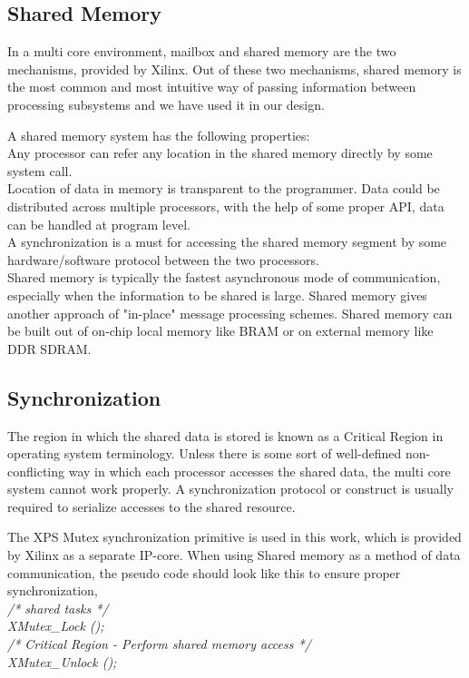 \documentclass[preprint,12pt]{elsarticle}
\begin{document}
 \subsection{ Shared Memory }
\label{shared}
 In a multi core environment, mailbox and shared memory \cite{mailbox} are the two mechanisms, provided by Xilinx. Out of these two mechanisms, shared memory is the most common and most intuitive way of passing information between processing subsystems and we have used it in our design.
\par A shared memory system has the following 
properties\cite{mailbox}:\\
\textbullet Any processor can refer any location in the  shared memory directly by some system call.\\
\textbullet Location of data in memory is transparent to the programmer. Data could be distributed across multiple processors, with the help of some proper API, data can be handled at program level.\\
\textbullet A synchronization is a must for accessing the shared memory segment by some
hardware/software protocol between the two processors.\\

Shared memory is typically the fastest asynchronous mode of communication,
especially when the information to be shared is large. Shared memory
gives another approach of "in-place" message processing schemes. Shared
memory can be built out of on-chip local memory like BRAM or on external memory like DDR SDRAM.
\subsection{Synchronization}
\label{sync}
The region in which the shared data is stored is known as a Critical Region
in operating system terminology. Unless there is some sort of well-defined non-conflicting way in
which each processor accesses the shared data, the multi core system cannot work properly. A synchronization protocol or construct
is usually required to serialize accesses to the shared resource.
\par The XPS Mutex synchronization primitive is used in this work, which is provided by Xilinx as a separate IP-core\cite{dual}.
When using Shared memory as a method of data communication, the pseudo code should look like this to ensure proper synchronization,\\
{\em /* shared tasks */}\\
{\em XMutex\_Lock ();}\\
{\em /* Critical Region - Perform shared memory access */}\\
{\em XMutex\_Unlock ();}\\
\end{document}
